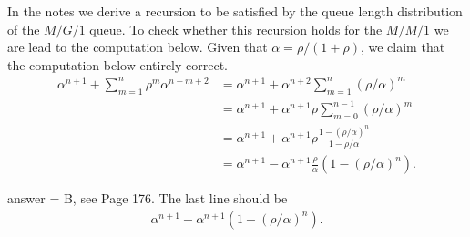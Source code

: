 \begin{exercise}[201807]{1}
In the notes we derive a recursion to be satisfied by the queue length distribution of  the $M/G/1$ queue. To check whether this recursion holds for the $M/M/1$ we are lead to the computation below. 
Given that $\alpha = \rho/(1+\rho)$, we claim that the computation below entirely correct. 
\begin{align*}
\alpha^{n+1} + \sum_{m=1}^n \rho^m \alpha^{n-m+2}  
&= \alpha^{n+1} + \alpha^{n+2}\sum_{m=1}^n (\rho/\alpha)^m  \\
&= \alpha^{n+1} + \alpha^{n+1}\rho \sum_{m=0}^{n-1} (\rho/\alpha)^m \\
&= \alpha^{n+1} + \alpha^{n+1}\rho \frac{1-(\rho/\alpha)^n}{1-\rho/\alpha}\\
&= \alpha^{n+1} - \alpha^{n+1}\frac{\rho}{\alpha}(1-(\rho/\alpha)^n).
\end{align*}
\begin{solution}
answer = B, see Page 176. The last line should be
\begin{align*}
\alpha^{n+1} - \alpha^{n+1}(1-(\rho/\alpha)^n).
\end{align*}
\end{solution}
\end{exercise}

